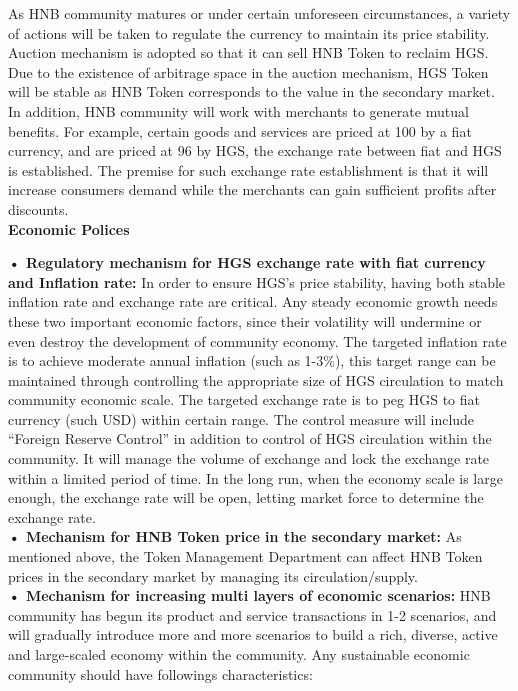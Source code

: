 \documentclass[fleqn,10pt]{SelfArx} %
\begin{document}
As HNB community matures or under certain unforeseen circumstances, a variety of actions will be taken to regulate the currency to maintain its price stability. Auction mechanism is adopted so that it can sell HNB Token to reclaim HGS. Due to the existence of arbitrage space in the auction mechanism, HGS Token will be stable as HNB Token corresponds to the value in the secondary market. In addition, HNB community will work with merchants to generate mutual benefits. For example, certain goods and services are priced at 100 by a fiat currency, and are priced at 96 by HGS, the exchange rate between fiat and HGS is established. The premise for such exchange rate establishment is that it will increase consumers demand while the merchants can gain sufficient profits after discounts. \\

\textbf {Economic Polices}

\textbf{•	Regulatory mechanism for HGS exchange rate with fiat currency and Inflation rate:}
In order to ensure HGS’s price stability, having both stable inflation rate and exchange rate are critical. Any steady economic growth needs these two important economic factors, since their volatility will undermine or even destroy the development of community economy. The targeted inflation rate is to achieve moderate annual inflation (such as 1-3\%), this target range can be maintained through controlling the appropriate size of HGS circulation to match community economic scale. The targeted exchange rate is to peg HGS to fiat currency (such USD) within certain range. The control measure will include “Foreign Reserve Control” in addition to control of HGS circulation within the community. It will manage the volume of exchange and lock the exchange rate within a limited period of time. In the long run, when the economy scale is large enough, the exchange rate will be open, letting market force to determine the exchange rate.\\

\textbf {•	Mechanism for HNB Token price in the secondary market:}
As mentioned above, the Token Management Department can affect HNB Token prices in the secondary market by managing its circulation/supply. \\

\textbf {•	Mechanism for increasing multi layers of economic scenarios:}
HNB community has begun its product and service transactions in 1-2 scenarios, and will gradually introduce more and more scenarios to build a rich, diverse, active and large-scaled economy within the community.  Any sustainable economic community should have followings characteristics:
\end{document}

